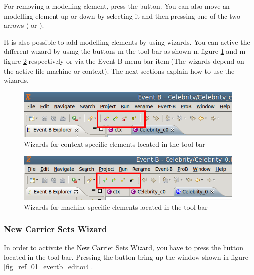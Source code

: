 For removing a modelling element, press the  button. You can also move an modelling element up or down by selecting it and then pressing one of the two arrows ( or ).

It is also possible to add modelling elements by using wizards. You can active the different wizard by using the buttons in the tool bar as shown in figure \ref{fig_ref_01_eventb_editor12} and in figure \ref{fig_ref_01_eventb_editor13} respectively or via the Event-B menu bar item (The wizards depend on the active file machine or context). The next sections explain how to use the wizards.

\begin{figure}[!h]
\begin{center}
	\includegraphics{img/reference/ref_01_eventb_editor12.png}
	\caption{Wizards for context specific elements located in the tool bar}
	\label{fig_ref_01_eventb_editor12}
\end{center}
\end{figure}

\begin{figure}[!h]
\begin{center}
	\includegraphics{img/reference/ref_01_eventb_editor13.png}
	\caption{Wizards for machine specific elements located in the tool bar}
	\label{fig_ref_01_eventb_editor13}
\end{center}
\end{figure}


\subsubsection{New Carrier Sets Wizard}

In order to activate the \textsf{New Carrier Sets Wizard}, you have to press the  button located in the tool bar. Pressing the button bring up the window shown in figure \ref{fig_ref_01_eventb_editor4}.

